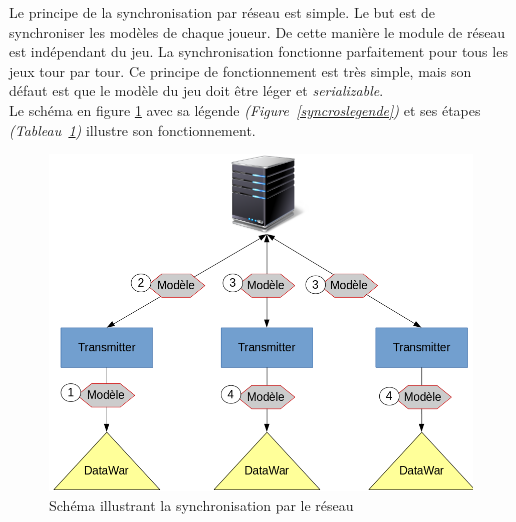 \documentclass[a4paper, titlepage]{livret}
\begin{document}
  Le principe de la synchronisation par réseau est simple. Le but est de synchroniser les modèles de chaque joueur. De cette manière le module de réseau est indépendant du jeu. La synchronisation fonctionne parfaitement pour tous les jeux tour par tour. Ce principe de fonctionnement est très simple, mais son défaut est que le modèle du jeu doit être léger et \textit{serializable}.
\\
Le schéma en figure \ref{syncros} avec sa légende \textit{(Figure~\ref{syncroslegende})} et ses étapes \textit{(Tableau~\ref{syncros})} illustre son fonctionnement.
  \begin{figure}[th]
      \begin{center}
        \includegraphics[scale=0.4]{Assets/s_r_2.png}
        \caption{Schéma illustrant la synchronisation par le réseau}
        \label{syncros}
      \end{center}
  \end{figure}
  
\end{document}
